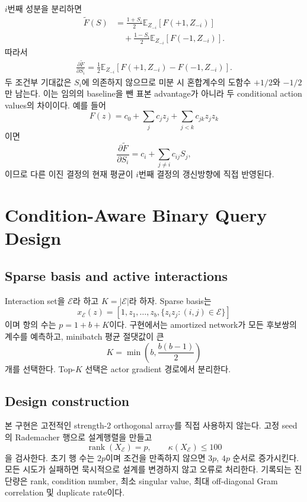 \documentclass[10pt,journal]{IEEEtran}
\newcommand{\E}{\mathbb{E}}
\begin{document}
$i$번째 성분을 분리하면
\begin{align}
\widetilde F(S)
&=\frac{1+S_i}{2}\E_{Z_{-i}}[F(+1,Z_{-i})]
\nonumber\\
&\quad+\frac{1-S_i}{2}\E_{Z_{-i}}[F(-1,Z_{-i})].
\end{align}
따라서
\begin{align}
\frac{\partial\widetilde F}{\partial S_i}
=\frac12\E_{Z_{-i}}\!\left[F(+1,Z_{-i})-F(-1,Z_{-i})\right].
\label{eq:supp-conditional}
\end{align}
두 조건부 기대값은 $S_i$에 의존하지 않으므로 미분 시 혼합계수의 도함수 $+1/2$와 $-1/2$만 남는다. 이는 임의의 baseline을 뺀 표본 advantage가 아니라 두 conditional action values의 차이이다. 예를 들어
\begin{equation}
F(z)=c_0+\sum_jc_jz_j+\sum_{j<k}c_{jk}z_jz_k
\end{equation}
이면
\begin{equation}
\frac{\partial\widetilde F}{\partial S_i}
=c_i+\sum_{j\ne i}c_{ij}S_j,
\end{equation}
이므로 다른 이진 결정의 현재 평균이 $i$번째 결정의 갱신방향에 직접 반영된다.

\section{Condition-Aware Binary Query Design}
\label{sec:design}

\subsection{Sparse basis and active interactions}

Interaction set을 $\mathcal E$라 하고 $K=|\mathcal E|$라 하자. Sparse basis는
\begin{equation}
x_{\mathcal E}(z)=
\left[1,z_1,\ldots,z_b,\{z_iz_j:(i,j)\in\mathcal E\}\right]
\end{equation}
이며 항의 수는 $p=1+b+K$이다. 구현에서는 amortized network가 모든 후보쌍의 계수를 예측하고, minibatch 평균 절댓값이 큰
\begin{equation}
K=\min\left(b,\frac{b(b-1)}{2}\right)
\end{equation}
개를 선택한다. Top-$K$ 선택은 actor gradient 경로에서 분리한다.

\subsection{Design construction}

본 구현은 고전적인 strength-2 orthogonal array를 직접 사용하지 않는다. 고정 seed의 Rademacher 행으로 설계행렬을 만들고
\begin{equation}
\operatorname{rank}(X_{\mathcal E})=p,
\qquad \kappa(X_{\mathcal E})\leq100
\label{eq:supp-design-condition}
\end{equation}
을 검사한다. 초기 행 수는 $2p$이며 조건을 만족하지 않으면 $3p$, $4p$ 순서로 증가시킨다. 모든 시도가 실패하면 묵시적으로 설계를 변경하지 않고 오류로 처리한다. 기록되는 진단량은 rank, condition number, 최소 singular value, 최대 off-diagonal Gram correlation 및 duplicate rate이다.
\end{document}
